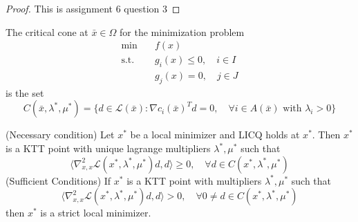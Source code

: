 \begin{proof}[Proof]
    This is assignment 6 question 3
\end{proof}
\begin{definition}
    The critical cone at $\bar x \in \Omega$ for the minimization problem 
    \begin{align*}
        \text{min} \quad &f(x) \\
        \text{s.t.} \quad &g_i(x) \leq 0, \quad i \in I \\
        &g_j(x) = 0, \quad j \in J
    \end{align*}
    is the set $$C(\bar x, \lambda^*, \mu^*) = \{d \in \mathcal L(\bar x): \nabla c_i(\bar x)^T d = 0, \quad \forall i \in A(\bar x) \text{ with } \lambda_i > 0\}$$
\end{definition}
\begin{theorem}
    (Necessary condition) Let $x^*$ be a local minimizer and LICQ holds at $x^*$. Then $x^*$ is a KTT point with unique lagrange multipliers $\lambda^*, \mu^*$ such that $$\langle \nabla^2_{x, x} \mathcal L(x^*, \lambda^*, \mu^*)d, d \rangle \geq 0, \quad \forall d \in C(x^*, \lambda^*, \mu^*)$$
    (Sufficient Conditions) If $x^*$ is a KTT point with multipliers $\lambda^*, \mu^*$ such that $$\langle \nabla^2_{x, x} \mathcal L(x^*, \lambda^*, \mu^*)d, d \rangle > 0, \quad \forall 0 \neq d \in C(x^*, \lambda^*, \mu^*)$$ then $x^*$ is a strict local minimizer. 
\end{theorem}